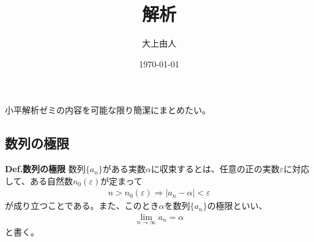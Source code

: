 \documentclass[a4paper,11pt]{jsarticle}
\numberwithin{equation}{section}
\begin{document}
\title{解析}
\author{大上由人}
\date{\today}
\maketitle

小平解析ゼミの内容を可能な限り簡潔にまとめたい。

\subsection{数列の極限}
\begin{itembox}[l]{\textbf{Def.数列の極限}}
    数列$\{a_n\}$がある実数$\alpha$に収束するとは、任意の正の実数$\varepsilon$に対応して、ある自然数$n_0(\varepsilon)$が定まって
    \begin{align}
        n > n_0(\varepsilon) \Rightarrow |a_n - \alpha| < \varepsilon
    \end{align}
    が成り立つことである。また、このとき$\alpha$を数列$\{a_n\}$の極限といい、
    \begin{align}
        \lim_{n \to \infty} a_n = \alpha
    \end{align}
    と書く。
\end{itembox}
\end{document}
